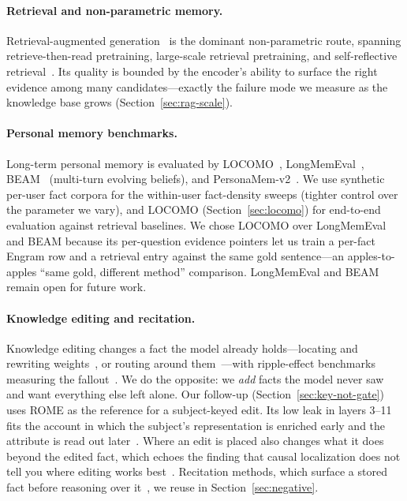\documentclass[11pt]{article}
\begin{document}
\paragraph{Retrieval and non-parametric memory.}
Retrieval-augmented generation~\citep{lewis2020rag,gao2023ragsurvey}
is the dominant non-parametric route, spanning retrieve-then-read
pretraining, large-scale retrieval pretraining, and self-reflective
retrieval~\citep{guu2020realm,khandelwal2020knnlm,borgeaud2022retro,izacard2023atlas,asai2024selfrag}.
Its quality is bounded by the encoder's ability to surface the right
evidence among many candidates---exactly the failure mode we measure
as the knowledge base grows (Section~\ref{sec:rag-scale}).

\paragraph{Personal memory benchmarks.} Long-term personal memory
is evaluated by LOCOMO~\citep{maharana2024locomo},
LongMemEval~\citep{wu2024longmemeval},
BEAM~\citep{liu2025beam} (multi-turn evolving beliefs), and
PersonaMem-v2~\citep{personamem2025}. We use synthetic per-user
fact corpora for the within-user fact-density sweeps (tighter
control over the parameter we vary), and LOCOMO
(Section~\ref{sec:locomo}) for end-to-end evaluation against
retrieval baselines. We chose LOCOMO over LongMemEval and BEAM
because its per-question evidence pointers let us train a
per-fact Engram row and a retrieval entry against the same gold
sentence---an apples-to-apples ``same gold, different
method'' comparison. LongMemEval and BEAM remain open for
future work.

\paragraph{Knowledge editing and recitation.}
Knowledge editing changes a fact the model already
holds---locating and rewriting weights~\citep{meng2022rome,meng2023memit,dai2022knowledge,yao2023editing},
or routing around them~\citep{mitchell2022mend,mitchell2022serac,wang2024wise}---with
ripple-effect benchmarks measuring the
fallout~\citep{mquake2023,rippleedits2023,counterfact2022}. We do the
opposite: we \emph{add} facts the model never saw and want everything
else left alone. Our follow-up (Section~\ref{sec:key-not-gate}) uses
ROME as the reference for a subject-keyed edit. Its low leak in layers 3--11
fits the account in which the subject's
representation is enriched early and the attribute is read out
later~\citep{geva2023dissecting}. Where an edit is placed also changes
what it does beyond the edited fact, which echoes the finding that
causal localization does not tell you where editing works
best~\citep{hase2023localization}. Recitation methods, which surface a stored fact
before reasoning over it~\citep{srrag2024,sun2023recitation}, we reuse
in Section~\ref{sec:negative}.
\end{document}
